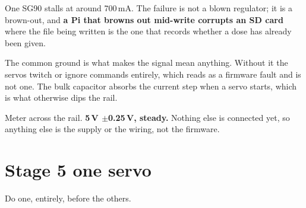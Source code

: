\documentclass[11pt,a4paper]{article}
\begin{document}
\begin{dangerbox}
One SG90 stalls at around 700\,mA. The failure is not a blown regulator; it is a
brown-out, and \textbf{a Pi that browns out mid-write corrupts an SD card}
\textemdash{} where the file being written is the one that records whether a
dose has already been given.
\end{dangerbox}

\noindent The common ground is what makes the signal mean anything. Without it
the servos twitch or ignore commands entirely, which reads as a firmware fault
and is not one. The bulk capacitor absorbs the current step when a servo starts,
which is what otherwise dips the rail.

\begin{provebox}
\provetitle
Meter across the rail. \textbf{5\,V $\pm$0.25\,V, steady.} Nothing else is
connected yet, so anything else is the supply or the wiring, not the firmware.
\end{provebox}

\section{Stage 5 \textemdash{} one servo}

Do one, entirely, before the others.
\end{document}
